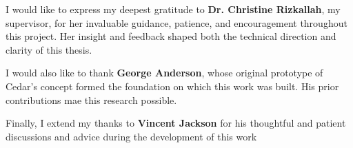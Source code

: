 I would like to express my deepest gratitude to \textbf{Dr. Christine Rizkallah},
my supervisor, for her invaluable guidance, patience, and
encouragement throughout this project. Her insight and feedback
shaped both the technical direction and clarity of this thesis.

I would also like to thank \textbf{George Anderson}, whose
original prototype of Cedar's concept formed the foundation
on which this work was built. His prior contributions mae this
research possible.

Finally, I extend my thanks to \textbf{Vincent Jackson} for his
thoughtful and patient discussions and advice during the
development of this work
